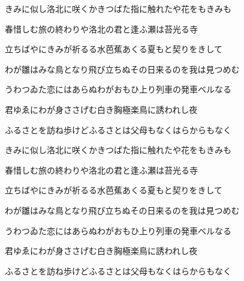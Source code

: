 \documentclass[リボン]{genkou}
\begin{document}
\begin{ribon}
きみに似し洛北に咲くかきつばた指に触れたや花をもきみも

春惜しむ旅の終わりや洛北の君と逢ふ瀬は苔光る寺

立ちばやにきみが祈るる水芭蕉あくる夏もと契りをきして

わが雛はみな鳥となり飛び立ちぬその日来るのを我は見つめむ

うわつゐた恋にはあらぬわがおもひ上り列車の発車ベルなる

君ゆゑにわが身ささげむ白き胸極楽鳥に誘われし夜

ふるさとを訪ね歩けどふるさとは父母もなくはらからもなく

\end{ribon}

\clearpage
\begin{ribon}
きみに似し洛北に咲くかきつばた指に触れたや花をもきみも

春惜しむ旅の終わりや洛北の君と逢ふ瀬は苔光る寺

立ちばやにきみが祈るる水芭蕉あくる夏もと契りをきして

わが雛はみな鳥となり飛び立ちぬその日来るのを我は見つめむ

うわつゐた恋にはあらぬわがおもひ上り列車の発車ベルなる

君ゆゑにわが身ささげむ白き胸極楽鳥に誘われし夜

ふるさとを訪ね歩けどふるさとは父母もなくはらからもなく

\end{ribon}
\end{document}
